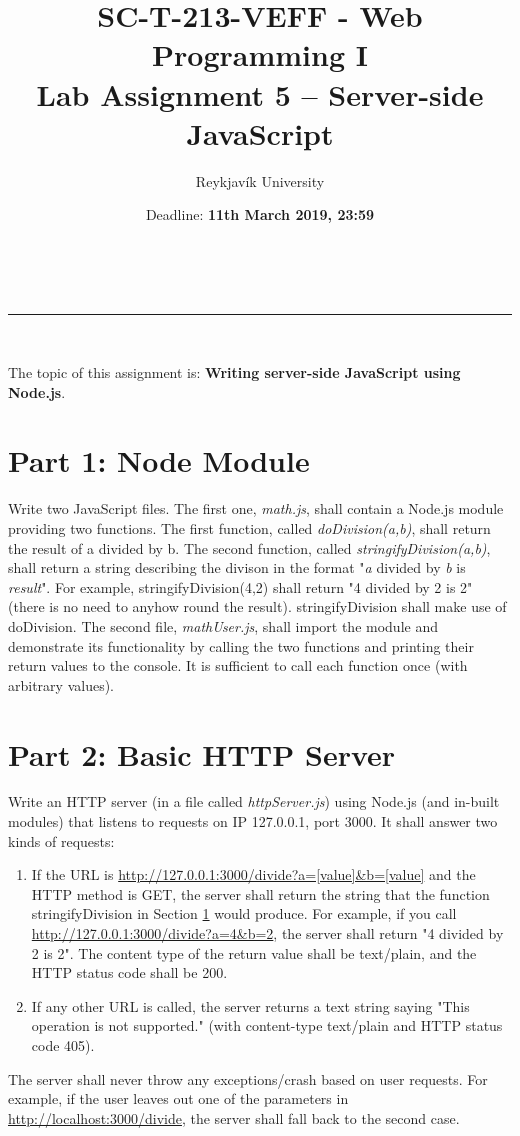 \documentclass[a4paper,11pt,fleqn]{article}
\makeatletter
\newcommand{\linia}{\rule{\linewidth}{0.5pt}}
\renewcommand{\maketitle}{
    \begin{center}
        \vspace{2ex}
        {\huge \textsc{\@title}}
        \vspace{1ex}
        \\
        \linia\\
        \@author \hfill \@date
        \vspace{4ex}
    \end{center}
}
\makeatother
\begin{document}
\title{SC-T-213-VEFF - Web Programming I\\
    \vspace{5ex} Lab Assignment 5 -- Server-side JavaScript}
\author{Reykjavík University}
\date{Deadline: \textbf{11th March 2019, 23:59}}

\maketitle

\noindent The topic of this assignment is: \textbf{Writing server-side JavaScript using Node.js}.

\section{Part 1: Node Module}
\label{sec:module}
Write two JavaScript files. The first one, \emph{math.js}, shall contain a Node.js module providing two functions. The first function, called \emph{doDivision(a,b)}, shall return the result of a divided by b. The second function, called \emph{stringifyDivision(a,b)}, shall return a string describing the divison in the format "\emph{a} divided by \emph{b} is \emph{result}". For example, stringifyDivision(4,2) shall return "4 divided by 2 is 2" (there is no need to anyhow round the result). stringifyDivision shall make use of doDivision.
The second file, \emph{mathUser.js}, shall import the module and demonstrate its functionality by calling the two functions and printing their return values to the console. It is sufficient to call each function once (with arbitrary values).

\section{Part 2: Basic HTTP Server}
Write an HTTP server (in a file called \emph{httpServer.js}) using Node.js (and in-built modules) that listens to requests on IP 127.0.0.1, port 3000. It shall answer two kinds of requests:
\begin{enumerate}
\item If the URL is \url{http://127.0.0.1:3000/divide?a=[value]&b=[value]} and the HTTP method is GET, the server shall return the string that the function stringifyDivision in Section \ref{sec:module} would produce. For example, if you call \url{http://127.0.0.1:3000/divide?a=4&b=2}, the server shall return "4 divided by 2 is 2". The content type of the return value shall be text/plain, and the HTTP status code shall be 200.
\item If any other URL is called, the server returns a text string saying "This operation is not supported." (with content-type text/plain and HTTP status code 405).
\end{enumerate}
The server shall never throw any exceptions/crash based on user requests. For example, if the user leaves out one of the parameters in \url{http://localhost:3000/divide}, the server shall fall back to the second case.
\end{document}
